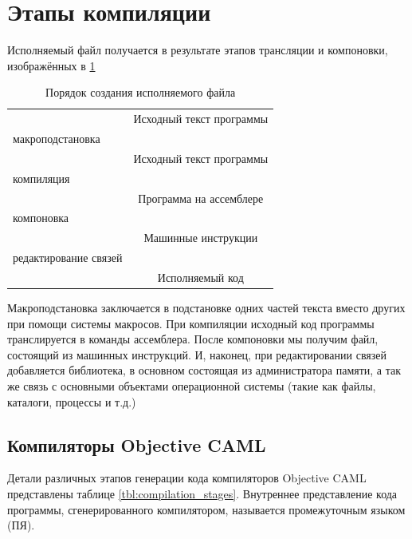 \section {Этапы компиляции}
\label{sec:steps_of_compilation}

Исполняемый файл получается в результате этапов трансляции и компоновки,
изображённых в \ref{tbl:steps_in_the_production_of_an_executable}

\begin{table}
	\begin{tabular}{lc}
	 & Исходный текст программы \\
	макроподстановка & \\
	 & Исходный текст программы \\
	компиляция & \\
	 & Программа на ассемблере \\
	компоновка & \\
	 & Машинные инструкции \\
	редактирование связей & \\
	 & Исполняемый код \\
	\end{tabular}
	\caption{\label{tbl:steps_in_the_production_of_an_executable}Порядок
создания исполняемого файла}
\end{table}

Макроподстановка заключается в подстановке одних частей текста вместо других при
помощи системы макросов. При компиляции исходный код программы транслируется в
команды ассемблера. После компоновки мы получим файл, состоящий из машинных
инструкций. И, наконец, при редактировании связей добавляется библиотека, в
основном состоящая из администратора памяти, а так же связь с основными
объектами операционной системы (такие как файлы, каталоги, процессы и т.д.)

\subsection {Компиляторы Objective CAML}
\label{subsec:the_objective_caml_compilers}

Детали различных этапов генерации кода компиляторов Objective CAML представлены
таблице \ref{tbl:compilation_stages}. Внутреннее представление кода программы,
сгенерированного компилятором, называется промежуточным языком (ПЯ).

